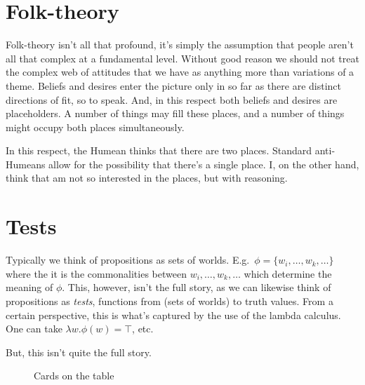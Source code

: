 \documentclass[10pt]{article}
\begin{document}
\section{Folk-theory}
\label{sec:folk-theory}

Folk-theory isn't all that profound, it's simply the assumption that people aren't all that complex at a fundamental level.
Without good reason we should not treat the complex web of attitudes that we have as anything more than variations of a theme.
Beliefs and desires enter the picture only in so far as there are distinct directions of fit, so to speak.
And, in this respect both beliefs and desires are placeholders.
A number of things may fill these places, and a number of things might occupy both places simultaneously.

In this respect, the Humean thinks that there are two places.
Standard anti-Humeans allow for the possibility that there's a single place.
I, on the other hand, think that am not so interested in the places, but with reasoning.


\section{Tests}
\label{sec:tests}

Typically we think of propositions as sets of worlds.
E.g.\ \(\phi = \{w_{i}, \dots, w_{k}, \dots\}\) where the it is the commonalities between \(w_{i}, \dots, w_{k}, \dots\) which determine the meaning of \(\phi\).
This, however, isn't the full story, as we can likewise think of propositions as \emph{tests}, functions from (sets of worlds) to truth values.
From a certain perspective, this is what's captured by the use of the lambda calculus.
One can take \(\lambda w.\phi(w) = \top\), etc.\

But, this isn't quite the full story.


\begin{figure}[h]
  \centering
  \caption{Cards on the table}
  \label{fig:cards}
\end{figure}



\newpage
\printbibliography
\end{document}
